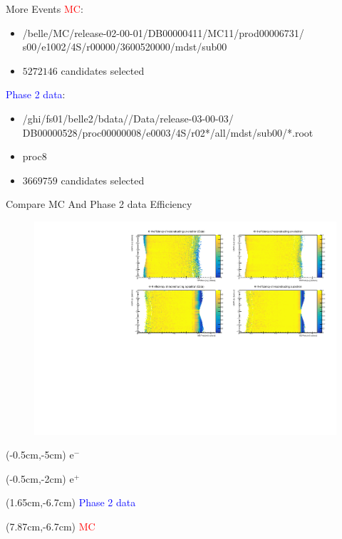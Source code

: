 \documentclass[8pt]{beamer}
\begin{document}
\begin{frame}{More Events}
	\textcolor{red}{MC}:
	\begin{itemize}
	
		\item /belle/MC/release-02-00-01/DB00000411/MC11/prod00006731/
		s00/e1002/4S/r00000/3600520000/mdst/sub00
		\item $ 5272146$ candidates selected
	\end{itemize}
	\textcolor{blue}{Phase 2 data}:
	\begin{itemize}
		\item /ghi/fs01/belle2/bdata//Data/release-03-00-03/
		DB00000528/proc00000008/e0003/4S/r02*/all/mdst/sub00/*.root
		\item proc8
		\item $3669759$ candidates selected 
	\end{itemize}

\end{frame}









\begin{frame}{Compare MC And Phase 2 data Efficiency}
	\begin{figure}
		\centering
		\includegraphics[width=\textwidth]{Plots/Eff/TPMCData}
	\end{figure}

	\begin{textblock*}{0.3\textwidth}(-0.5cm,-5cm)
	$\textrm{e}^-$
\end{textblock*}
\begin{textblock*}{0.3\textwidth}(-0.5cm,-2cm)
	$\textrm{e}^+$
\end{textblock*}


\begin{textblock*}{0.3\textwidth}(1.65cm,-6.7cm)
	\textcolor{blue}{Phase 2 data}
\end{textblock*}


\begin{textblock*}{0.3\textwidth}(7.87cm,-6.7cm)
	\textcolor{red}{MC}
\end{textblock*}



\end{frame}
\end{document}
